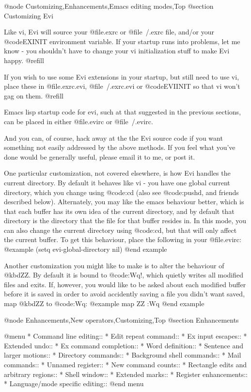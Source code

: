 @node Customizing,Enhancements,Emacs editing modes,Top
@section Customizing Evi

Like vi, Evi will source your @file{.exrc} or @file{~/.exrc} file,
and/or your @code{EXINIT}
environment variable.  If your startup runs into problems, let me know -
you shouldn't have to change your vi initialization stuff to make Evi
happy. @refill

If you wish to use some Evi extensions in your startup, but still need
to use vi, place these in @file{.exrc.evi}, @file{~/.exrc.evi}
or @code{EVIINIT} so that vi won't gag on them. @refill

Emacs lisp startup code for evi, such at that suggested in the previous
sections, can be placed in either @file{.evirc} or @file{~/.evirc}.

And you can, of course, hack away at the the Evi source code if you want
something not easily addressed by the above methods.  If you feel what
you've done would be generally useful, please email it to me, or post it.

One particular customization, not covered elsewhere, is how Evi handles
the current directory.  By default it behaves like vi - you have one
global current directory, which you change using @code{:cd} (also see
@code{:pushd}, and friends described below).  Alternately, you may like the
emacs behaviour better, which is that each buffer has its own idea of
the current directory, and by default that directory is the directory
that the file for that buffer resides in.  In this mode, you can also
change the current directory using @code{:cd}, but that will only affect the
current buffer.  To get this behaviour, place the following in your
@file{.evirc}:
@example
(setq evi-global-directory nil)
@end example

Another customization you might like to make is to alter the behaviour
of @kbd{ZZ}.  By default it is bound to @code{:Wq!}, which quietly writes all
modified files and exits.  If, however, you would like to be asked about
each modified buffer before it is saved in order to avoid accidently
saving a file you didn't want saved, map @kbd{ZZ} to @code{:Wq}:
@example
map ZZ :Wq\n
@end example

@node Enhancements,New operators,Customizing,Top
@section Enhancements

@menu
* Command line editing::
* Edit repeat command::
* Ex input escapes::
* Extended undo::
* Ex command completion::
* Word definition::
* Sentence and larger motions::
* Directory commands::
* Background shell commands::
* Mail commands::
* Unnamed register::
* New command counts::
* Rectangle edits and arbitrary regions::
* Shell window::
* Extended marks::
* Register enhancements::
* Language/mode specific editing::
@end menu

